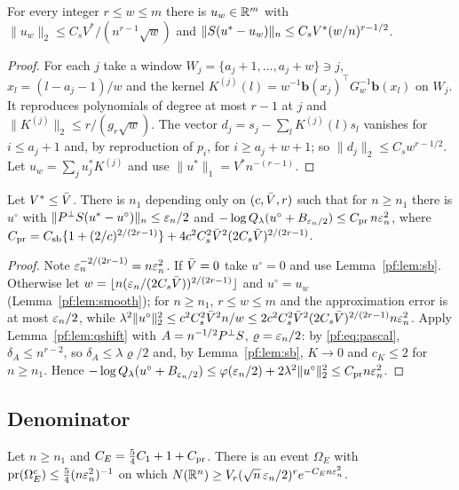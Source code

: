 \begin{lemma}\label{pf:lem:smooth}
For every integer $r\le w\le m$ there is $u_w\in\mathbb{R}^m$ with $\|u_w\|_2\le C_sV^{*}/(n^{r-1}\sqrt w)$ and $\|S(u^{*}-u_w)\|_n\le C_sV^{*}(w/n)^{r-1/2}$.
\end{lemma}

\begin{proof}
For each $j$ take a window $W_j=\{a_j+1,\dots,a_j+w\}\ni j$, $x_l=(l-a_j-1)/w$ and the kernel $K^{(j)}(l)=w^{-1}\mathbf b(x_j)^\top G_w^{-1}\mathbf b(x_l)$ on $W_j$. It reproduces polynomials of degree at most $r-1$ at $j$ and $\|K^{(j)}\|_2\le r/(g_r\sqrt w)$. The vector $d_j=s_j-\sum_lK^{(j)}(l)s_l$ vanishes for $i\le a_j+1$ and, by reproduction of $p_i$, for $i\ge a_j+w+1$; so $\|d_j\|_2\le C_sw^{r-1/2}$. Let $u_w=\sum_ju^{*}_jK^{(j)}$ and use $\|u^{*}\|_1=V^{*}n^{-(r-1)}$.
\end{proof}

\begin{proposition}\label{pf:prop:prior}
Let $V^{*}\le\bar V$. There is $n_1$ depending only on $(c,\bar V,r)$ such that for $n\ge n_1$ there is $u^\circ$ with
$\|P^{\perp} S(u^{*}-u^\circ)\|_n\le\varepsilon_n/2$ and $-\log Q_\lambda(u^\circ+B_{\varepsilon_n/2})\le C_{\rm pr}\,n\varepsilon_n^2$, where
$C_{\rm pr}=C_{\rm sb}\{1+(2/c)^{2/(2r-1)}\}+4c^2C_s^2\bar V^2(2C_s\bar V)^{2/(2r-1)}$.
\end{proposition}

\begin{proof}
Note $\varepsilon_n^{-2/(2r-1)}=n\varepsilon_n^2$. If $\bar V=0$ take $u^\circ=0$ and use Lemma~\ref{pf:lem:sb}. Otherwise let $w=\lfloor n(\varepsilon_n/(2C_s\bar V))^{2/(2r-1)}\rfloor$ and $u^\circ=u_w$ (Lemma~\ref{pf:lem:smooth}); for $n\ge n_1$, $r\le w\le m$ and the approximation error is at most $\varepsilon_n/2$, while
$\lambda^2\|u^\circ\|_2^2\le c^2C_s^2\bar V^2n/w\le2c^2C_s^2\bar V^2(2C_s\bar V)^{2/(2r-1)}n\varepsilon_n^2$.
Apply Lemma~\ref{pf:lem:qshift} with $A=n^{-1/2}P^{\perp} S$, $\varrho=\varepsilon_n/2$: by \eqref{pf:eq:pascal}, $\delta_A\le n^{r-2}$, so $\delta_A\le\lambda\varrho/2$ and, by Lemma~\ref{pf:lem:sb}, $K\to0$ and $c_K\le2$ for $n\ge n_1$. Hence $-\log Q_\lambda(u^\circ+B_{\varepsilon_n/2})\le\varphi(\varepsilon_n/2)+2\lambda^2\|u^\circ\|_2^2\le C_{\rm pr}n\varepsilon_n^2$.
\end{proof}

\subsection{Denominator}

\begin{lemma}[denominator]\label{pf:lem:evid}
Let $n\ge n_1$ and $C_E=\tfrac54C_1+1+C_{\rm pr}$. There is an event $\Omega_E$ with $\mathrm{pr}(\Omega_E^c)\le\tfrac54(n\varepsilon_n^2)^{-1}$ on which $N(\mathbb{R}^n)\ge V_r(\sqrt n\,\varepsilon_n/2)^re^{-C_En\varepsilon_n^2}$.
\end{lemma}


